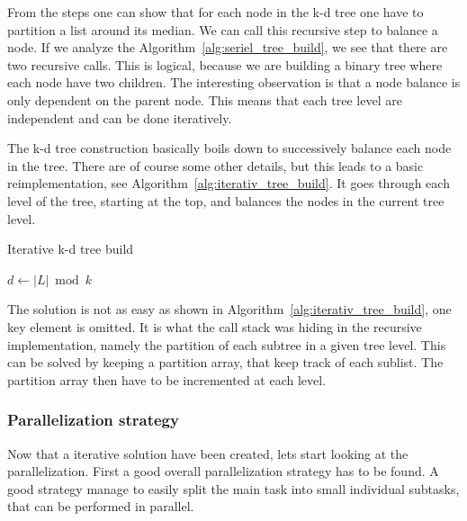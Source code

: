 From the steps one can show that for each node in the k-d tree one have to partition a list around its median. We can call this recursive step to balance a node.  If we analyze the Algorithm~\ref{alg:seriel_tree_build}, we see that there are two recursive calls. This is logical, because we are building a binary tree where each node have two children. The interesting observation is that a node balance is only dependent on the parent node. This means that each tree level are independent and can be done iteratively.

The k-d tree construction basically boils down to successively balance each node in the tree. There are of course some other details, but this leads to a basic reimplementation, see Algorithm~\ref{alg:iterativ_tree_build}. It goes through each level of the tree, starting at the top, and balances the nodes in the current tree level.

\begin{algorithm}
\caption{Iterative k-d tree build}
\label{alg:iterativ_tree_build}
\begin{algorithmic}
                \State$d \gets |L| \bmod k$ 
                \State {}
            \EndFor
        \EndFor
    \EndFunction
\end{algorithmic}
\end{algorithm}


The solution is not as easy as shown in Algorithm~\ref{alg:iterativ_tree_build}, one key element is omitted. It is what the call stack was hiding in the recursive implementation, namely the partition of each subtree in a given tree level. This can be solved by keeping a partition array, that keep track of each sublist. The partition array then have to be incremented at each level.



\subsubsection{Parallelization strategy} %
\label{ssub:parallelization_strategy}


Now that a iterative solution have been created, lets start looking at the parallelization. First a good overall parallelization strategy has to be found. A good strategy manage to easily split the main task into small individual subtasks, that can be performed in parallel.


